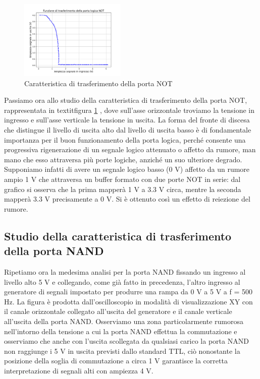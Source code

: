 \documentclass[journal]{IEEEtran}
\begin{document}
\begin{figure}[H]%
\begin{center}
\includegraphics[width=0.45\textwidth]{analysis/output/inverter_ring_xy.pdf}
\caption{Caratteristica di trasferimento della porta NOT}
\label{fig:transf_not}
\end{center}
\end{figure}

Passiamo ora allo studio della caratteristica di trasferimento della porta NOT, rappresentata in textit{figura \ref{fig:transf_not}}
, dove sull'asse orizzontale troviamo la tensione in ingresso e sull'asse verticale la tensione in uscita. La forma del fronte di discesa che distingue il livello di uscita alto dal livello di uscita basso è di fondamentale importanza per il buon funzionamento della porta logica, perché consente una progressiva rigenerazione di un segnale logico attenuato o affetto da rumore, man mano che esso attraversa più porte logiche, anziché un suo ulteriore degrado. Supponiamo infatti di avere un segnale logico basso (0 V) affetto da un rumore ampio 1 V che attraversa un buffer formato con due porte NOT in serie: dal grafico si osserva che la prima mapperà 1 V a 3.3 V circa, mentre la seconda mapperà 3.3 V precisamente a 0 V. Si è ottenuto così un effetto di reiezione del rumore.




\subsection{Studio della caratteristica di trasferimento della porta NAND}
Ripetiamo ora la medesima analisi per la porta NAND fissando un ingresso al livello alto 5 V e collegando, come già fatto in precedenza, l'altro ingresso al generatore di segnali impostato per produrre una rampa da 0 V a 5 V a f = 500 Hz. La figura è prodotta dall'oscilloscopio in modalità di visualizzazione XY con il canale orizzontale collegato all'uscita del generatore e il canale verticale all'uscita della porta NAND. Osserviamo una zona particolarmente rumorosa nell'intorno della tensione a cui la porta NAND effettua la commutazione e osserviamo che anche con l'uscita scollegata da qualsiasi carico la porta NAND non raggiunge i 5 V in uscita previsti dallo standard TTL, ciò nonostante la posizione della soglia di commutazione a circa 1 V garantisce la corretta interpretazione di segnali alti con ampiezza 4 V.
\end{document}
